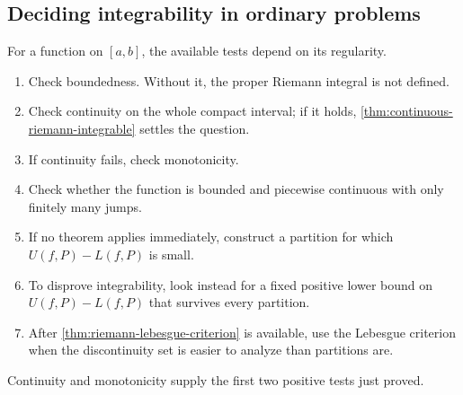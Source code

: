 \subsection*{Deciding integrability in ordinary problems}
For a function on \([a,b]\), the available tests depend on its regularity.
\begin{enumerate}[label=\arabic*.,leftmargin=*]
\item Check boundedness. Without it, the proper Riemann integral is not
defined.
\item Check continuity on the whole compact interval; if it holds,
\cref{thm:continuous-riemann-integrable} settles the question.
\item If continuity fails, check monotonicity.
\item Check whether the function is bounded and piecewise continuous with
only finitely many jumps.
\item If no theorem applies immediately, construct a partition for which
\(U(f,P)-L(f,P)\) is small.
\item To disprove integrability, look instead for a fixed positive lower
bound on \(U(f,P)-L(f,P)\) that survives every partition.
\item After \cref{thm:riemann-lebesgue-criterion} is available, use the
Lebesgue criterion when the discontinuity set is easier to analyze than
partitions are.
\end{enumerate}
Continuity and monotonicity supply the first two positive tests just proved.

